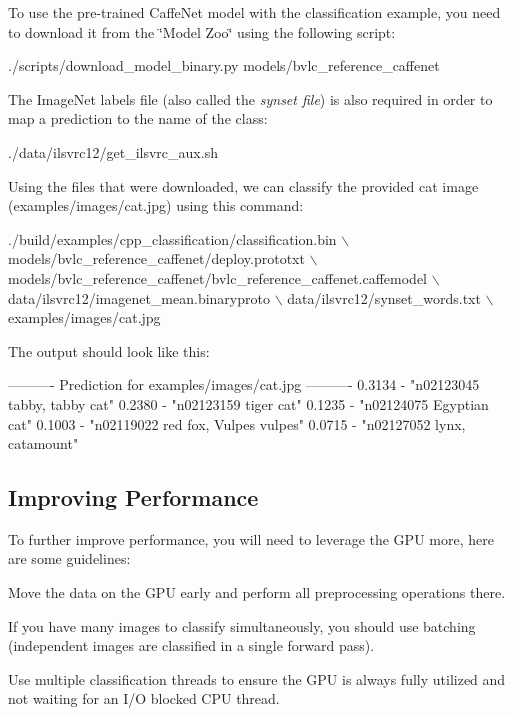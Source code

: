 To use the pre-\/trained Caffe\+Net model with the classification example, you need to download it from the \char`\"{}\+Model Zoo\char`\"{} using the following script\+: 
\begin{DoxyCode}
./scripts/download\_model\_binary.py models/bvlc\_reference\_caffenet
\end{DoxyCode}
 The Image\+Net labels file (also called the {\itshape synset file}) is also required in order to map a prediction to the name of the class\+: 
\begin{DoxyCode}
./data/ilsvrc12/get\_ilsvrc\_aux.sh
\end{DoxyCode}
 Using the files that were downloaded, we can classify the provided cat image ({\ttfamily examples/images/cat.\+jpg}) using this command\+: 
\begin{DoxyCode}
./build/examples/cpp\_classification/classification.bin \(\backslash\)
  models/bvlc\_reference\_caffenet/deploy.prototxt \(\backslash\)
  models/bvlc\_reference\_caffenet/bvlc\_reference\_caffenet.caffemodel \(\backslash\)
  data/ilsvrc12/imagenet\_mean.binaryproto \(\backslash\)
  data/ilsvrc12/synset\_words.txt \(\backslash\)
  examples/images/cat.jpg
\end{DoxyCode}
 The output should look like this\+: 
\begin{DoxyCode}
---------- Prediction for examples/images/cat.jpg ----------
0.3134 - "n02123045 tabby, tabby cat"
0.2380 - "n02123159 tiger cat"
0.1235 - "n02124075 Egyptian cat"
0.1003 - "n02119022 red fox, Vulpes vulpes"
0.0715 - "n02127052 lynx, catamount"
\end{DoxyCode}


\subsection*{Improving Performance}

To further improve performance, you will need to leverage the G\+PU more, here are some guidelines\+:


\begin{DoxyItemize}
\item Move the data on the G\+PU early and perform all preprocessing operations there.
\item If you have many images to classify simultaneously, you should use batching (independent images are classified in a single forward pass).
\item Use multiple classification threads to ensure the G\+PU is always fully utilized and not waiting for an I/O blocked C\+PU thread. 
\end{DoxyItemize}